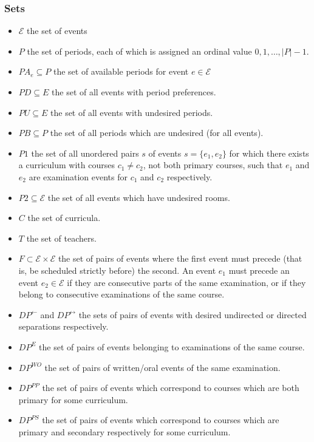 \documentclass{article}
\newcommand{\E}{\mathcal{E}}
\begin{document}
\subsubsection*{Sets}
\begin{itemize}
    \item $\E$ the set of events
    \item $P$ the set of periods, each of which is assigned an ordinal value
        $0,1,\dots, |P| - 1$.
    \item $PA_e \subseteq P$ the set of available periods for event $e \in \E$
    \item $PD \subseteq E$ the set of all events with period preferences.
    \item $PU \subseteq E$ the set of all events with undesired periods.
    \item $PB \subseteq P$ the set of all periods which are undesired (for all
        events).
    \item $P1$ the set of all unordered pairs $s$ of events $s = \{e_1, e_2\}$
        for which there exists a curriculum with courses $c_1 \neq c_2$, not
        both primary courses, such that $e_1$ and $e_2$ are examination events
        for $c_1$ and $c_2$ respectively.
    \item $P2 \subseteq \E$ the set of all events which have undesired rooms.
    \item $C$ the set of curricula.
    \item $T$ the set of teachers.
    \item $F \subset \E \times \E$ the set of pairs of events where the first
        event must precede (that is, be scheduled strictly before) the second.
        An event $e_1$ must precede an event $e_2 \in \E$ if they are consecutive
        parts of the same examination, or if they belong to consecutive
        examinations of the same course.
    \item $DP^\leftarrow$ and $DP^\leftrightarrow$ the sets of pairs of events
        with desired undirected or directed separations respectively.
    \item $DP^E$ the set of pairs of events belonging to examinations of the same
        course.
    \item $DP^{WO}$ the set of pairs of written/oral events of the same examination.
    \item $DP^{PP}$ the set of pairs of events which correspond to courses which are
        both primary for some curriculum.
    \item $DP^{PS}$ the set of pairs of events which correspond to courses which are
        primary and secondary respectively for some curriculum. 
\end{itemize}
\end{document}
